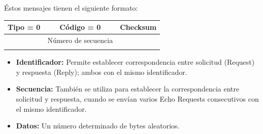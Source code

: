 Éstos mensajes tienen el siguiente formato:

\begin{table}[H]
\centering
\begin{tabular}{|c|c|c|}
\hline
\rowcolor[HTML]{9AFF99} 
Tipo = 0 & Código = 0  & Checksum \\ \hline
\rowcolor[HTML]{FDAAAA} 
\multicolumn{2}{|c|}{\cellcolor[HTML]{FDAAAA}{\color[HTML]{000000} Identificador}} & {\color[HTML]{000000} Número de secuencia} \\ \hline
\rowcolor[HTML]{FDAAAA} 
\multicolumn{3}{|c|}{\cellcolor[HTML]{FDAAAA}Datos :::}  \\ \hline
\end{tabular}
\end{table}
\begin{itemize}
    \item \textbf{Identificador:} Permite establecer correspondencia entre solicitud (Request) y respuesta (Reply); ambos con el mismo identificador.
    \item \textbf{Secuencia:} También se utiliza para establecer la correspondencia entre solicitud y respuesta, cuando se envían varios Echo Requests consecutivos con el mismo identificador.
    \item \textbf{Datos:} Un número determinado de bytes aleatorios.
\end{itemize}

